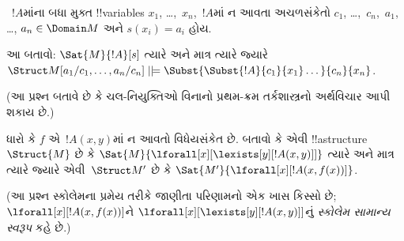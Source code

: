 \documentclass[../../../include/open-logic-section]{subfiles}
\begin{document}
\begin{prob}
\begin{enumerate}
\end{enumerate}
~$!A$માંના બધા મુક્ત !!{variable}s $x_1$, \dots,~$x_n$,~$!A$માં ન
આવતા અચળસંકેતો $c_1$, \dots,~$c_n$,~$a_1$, \dots,
$a_n \in \Domain M$ અને $s(x_i)=a_i$ હોય.

આ બતાવો:
$\Sat{M}{!A}[s]$ ત્યારે અને માત્ર ત્યારે જ્યારે
$\Struct M[a_1/c_1,\dots,a_n/c_n]
\VDash \Subst{\Subst{!A}{c_1}{x_1}\dots}{c_n}{x_n}$.

(આ પ્રશ્ન બતાવે છે કે ચલ-નિયુક્તિઓ વિનાનો પ્રથમ-ક્રમ તર્કશાસ્ત્રનો
અર્થવિચાર આપી શકાય છે.)
\end{prob}

\begin{prob}
ધારો કે $f$ એ~$!A(x,y)$માં ન આવતો વિધેયસંકેત છે. બતાવો કે એવી
!!a{structure}~$\Struct{M}$ છે કે
$\Sat{M}{\lforall[x][\lexists[y][!A(x,y)]]}$ ત્યારે અને માત્ર ત્યારે
જ્યારે એવી~$\Struct M'$ છે કે
$\Sat{M'}{\lforall[x][!A(x,f(x))]}$.

(આ પ્રશ્ન સ્કોલેમના પ્રમેય તરીકે જાણીતા પરિણામનો એક ખાસ કિસ્સો છે;
$\lforall[x][!A(x,f(x))]$ને
$\lforall[x][\lexists[y][!A(x,y)]]$નું \emph{સ્કોલેમ સામાન્ય સ્વરૂપ}
કહે છે.)
\end{prob}
\end{document}
